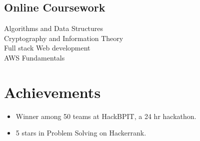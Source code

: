 \documentclass[letterpaper]{main}
\begin{document}
\begin{minipage}[t]{0.29\textwidth}
\subsection{Online Coursework}
\sectionspace
Algorithms and Data Structures \\
Cryptography and Information Theory \\
Full stack Web development \\
AWS Fundamentals \\


\section{Achievements}
\begin{itemize}
\item Winner among 50 teams at HackBPIT, a 24 hr hackathon.
\item 5 stars in Problem Solving on Hackerrank.
\end{itemize}
\sectionspace 

\end{minipage} 
\hfill
%
%
\end{document}
